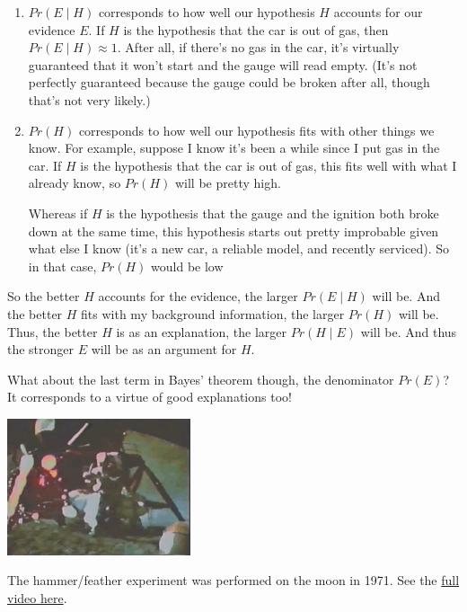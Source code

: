 \documentclass[justified]{tufte-book}
\newcommand{\given}{\mid}
\newcommand{\p}{Pr}
\theoremstyle{definition}
\theoremstyle{definition}
\theoremstyle{definition}
\theoremstyle{definition}
\theoremstyle{remark}
\begin{document}
\begin{enumerate}
\def\labelenumi{\arabic{enumi}.}
\item
  \(\p(E \given H)\) corresponds to how well our hypothesis \(H\) accounts for our evidence \(E\). If \(H\) is the hypothesis that the car is out of gas, then \(\p(E \given H) \approx 1\). After all, if there's no gas in the car, it's virtually guaranteed that it won't start and the gauge will read empty. (It's not perfectly guaranteed because the gauge could be broken after all, though that's not very likely.)
\item
  \(\p(H)\) corresponds to how well our hypothesis fits with other things we know. For example, suppose I know it's been a while since I put gas in the car. If \(H\) is the hypothesis that the car is out of gas, this fits well with what I already know, so \(\p(H)\) will be pretty high.

  Whereas if \(H\) is the hypothesis that the gauge and the ignition both broke down at the same time, this hypothesis starts out pretty improbable given what else I know (it's a new car, a reliable model, and recently serviced). So in that case, \(\p(H)\) would be low
\end{enumerate}

So the better \(H\) accounts for the evidence, the larger \(\p(E \given H)\) will be. And the better \(H\) fits with my background information, the larger \(\p(H)\) will be. Thus, the better \(H\) is as an explanation, the larger \(\p(H \given E)\) will be. And thus the stronger \(E\) will be as an argument for \(H\).

What about the last term in Bayes' theorem though, the denominator \(\p(E)\)? It corresponds to a virtue of good explanations too!





\begin{marginfigure}
\includegraphics[width=2.12in]{img/moon} \caption[The hammer/feather experiment was performed on the moon in 1971. See the \href{https://bit.ly/1KLQzOB}{full video here}.]{The hammer/feather experiment was performed on the moon in 1971. See the \href{https://bit.ly/1KLQzOB}{full video here}.}\label{fig:unnamed-chunk-86}
\end{marginfigure}
\end{document}
